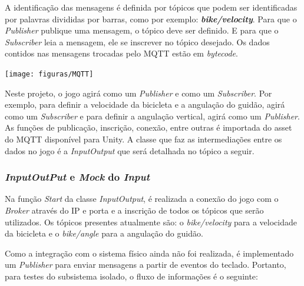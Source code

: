 A identificação das mensagens é definida por tópicos que podem ser identificadas por palavras divididas por barras, como por exemplo: \textit{\textbf{bike/velocity}}. Para que o \textit{Publisher} publique uma mensagem, o tópico deve ser definido. E para que o \textit{Subscriber} leia a mensagem, ele se inscrever no tópico desejado. Os dados contidos nas mensagens trocadas pelo MQTT estão em \textit{bytecode}.

\begin{center}
	\texttt{[image: figuras/MQTT]}
	\label{figura:mqttsoft}
\end{center}


Neste projeto, o jogo agirá como um \textit{Publisher} e como um \textit{Subscriber}. Por exemplo, para definir a velocidade da bicicleta e a angulação do guidão, agirá como um \textit{Subscriber} e para definir a angulação vertical, agirá como um \textit{Publisher}. As funções de publicação, inscrição, conexão, entre outras é importada do asset do MQTT disponível para Unity.  A classe que faz as intermediações entre os dados no jogo é a \textit{InputOutput} que será detalhada no tópico a seguir.

\subsubsection{\textit{InputOutPut} e \textit{Mock} do \textit{Input}}

Na função \textit{Start} da classe  \textit{InputOutput}, é realizada a conexão do jogo com o \textit{Broker} através do IP e porta e a inscrição de todos os tópicos que serão utilizados. Os tópicos presentes atualmente são: o \textit{bike/velocity} para a velocidade da bicicleta e o \textit{bike/angle} para a angulação do guidão.

Como a integração com o sistema físico ainda não foi realizada, é implementado um \textit{Publisher} para enviar mensagens a partir de eventos do teclado. Portanto, para testes do subsistema isolado, o fluxo de informações é o seguinte:

